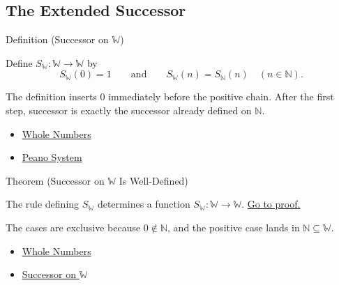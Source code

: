 \subsection*{The Extended Successor}

\begin{definitionbox}{Definition (Successor on \texorpdfstring{$\mathbb{W}$}{W})}
\begin{definition}
\label{def:successor-on-w}
Define $S_{\mathbb{W}}:\mathbb{W}\to\mathbb{W}$ by
\[
S_{\mathbb{W}}(0)=1
\qquad\text{and}\qquad
S_{\mathbb{W}}(n)=S_{\mathbb{N}}(n)\quad(n\in\mathbb{N}).
\]
\end{definition}
\end{definitionbox}

\begin{remark*}[Interpretation]
The definition inserts $0$ immediately before the positive chain. After the
first step, successor is exactly the successor already defined on
$\mathbb{N}$.
\end{remark*}

\begin{dependencies}
\begin{itemize}
  \item \hyperref[def:whole-numbers]{Whole Numbers}
  \item \hyperref[def:peano-system]{Peano System}
\end{itemize}
\end{dependencies}

\begin{theorembox}{Theorem (Successor on \texorpdfstring{$\mathbb{W}$}{W} Is Well-Defined)}
\begin{theorem}
\label{thm:successor-on-w-well-defined}
The rule defining $S_{\mathbb{W}}$ determines a function
$S_{\mathbb{W}}:\mathbb{W}\to\mathbb{W}$.
\hyperref[prf:successor-on-w-well-defined]{Go to proof.}
\end{theorem}
\end{theorembox}

\begin{remark*}[Interpretation]
The cases are exclusive because $0\notin\mathbb{N}$, and the positive case
lands in $\mathbb{N}\subseteq\mathbb{W}$.
\end{remark*}

\begin{dependencies}
\begin{itemize}
  \item \hyperref[def:whole-numbers]{Whole Numbers}
  \item \hyperref[def:successor-on-w]{Successor on $\mathbb{W}$}
\end{itemize}
\end{dependencies}

